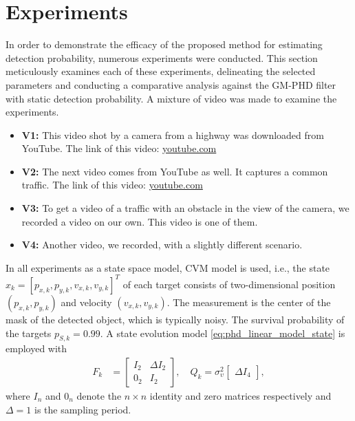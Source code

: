 \chapter{Experiments}
In order to demonstrate the efficacy of the proposed method for estimating detection probability, numerous experiments were conducted. This section meticulously examines each of these experiments, delineating the selected parameters and conducting a comparative analysis against the GM-PHD filter with static detection probability.
A mixture of video was made to examine the experiments.
\begin{itemize}
  \item \textbf{V1:} This video shot by a camera from a highway was downloaded from YouTube. The link of this video: \href{https://www.youtube.com/watch?v=KBsqQez-O4w&t=30s&ab_channel=NickMartinez}{youtube.com}
  \item \textbf{V2:} The next video comes from YouTube as well. It captures a common traffic. The link of this video: \href{https://www.youtube.com/watch?v=7WFYiZersNc&ab_channel=AbdulMunaim}{youtube.com}
  \item \textbf{V3:} To get a video of a traffic with an obstacle in the view of the camera, we recorded a video on
  our own. This video is one of them.
  \item \textbf{V4:} Another video, we recorded, with a slightly different scenario.
\end{itemize}

In all experiments as a state space model, CVM model is used, i.e., the state $x_k = [p_{x,k},p_{y,k},v_{x,k},v_{y,k}]^T$ of each target consists of two-dimensional position $(p_{x,k},p_{y,k})$ and velocity $(v_{x,k},v_{y,k})$. The measurement is the center of the mask of the detected object, which is typically noisy. The survival probability of the targets $p_{S,k} = 0.99$. A state evolution model \eqref{eq:phd_linear_model_state} is employed with
\begin{align}
  F_k &=
  \begin{bmatrix}
    I_2 & \Delta I_2 \\
    0_2 & I_2
  \end{bmatrix},
  \quad
  Q_k = \sigma_{\upsilon}^2
  \begin{bmatrix}
    \Delta I_4
  \end{bmatrix},
\end{align}
where $I_n$ and $0_n$ denote the $n\times n$ identity and zero matrices respectively and $\Delta = 1$ is the sampling
period.


